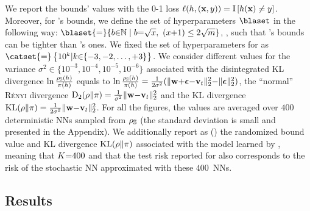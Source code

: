 We report the bounds' values with the 0-1 loss $\ell(h, (\mathbf{x},y))=\operatorname{I}\left[ h(\mathbf{x})\ne y\right]$.
Moreover, for \algoblanchard's bounds, we define the set of hyperparameters $\blaset$ in the following way: \mbox{$\blaset{=}\{ b{\in}\Nbb \;\vert\;  b{=}\sqrt{x},\ (x{+}1) \le 2\sqrt{\m} \}$}, \ie, such that \algoblanchard's bounds can be tighter than \algorivasplata's ones.
We fixed the set of hyperparameters for \algocatoni as $\catset{=}\left\{10^{k} \vert k{\in}\{-3, -2, \dots, +3\}\right\}$.
We consider different values for the variance $\sigma^2 {\in} \{10^{-3}, 10^{-4}, 10^{-5}, 10^{-6}\}$ associated with the disintegrated KL divergence $\ln\frac{\rho_{\mathbb{S}}(h)}{\pi(h)}$ equals to $\ln\frac{\rho_{\mathbb{S}}(h)}{\pi(h)}= \frac{1}{2\sigma^2}(\| \mathbf{w}{+}\boldsymbol{\epsilon}{-}\mathbf{v}_t\|^2_{2} {-}\|\boldsymbol{\epsilon}\|^2_{2})$, the ``normal'' \textsc{Rényi} divergence $\operatorname{D}_2(\rho\|\pi)=\tfrac{1}{\sigma^2}\|\mathbf{w}{-}\mathbf{v}_t\|_{2}^{2}$ and the KL divergence $\operatorname{KL}(\rho\|\pi)=\tfrac{1}{2\sigma^2}\|\mathbf{w}{-}\mathbf{v}_t\|_{2}^{2}$.
For all the figures, the values are averaged over $400$ deterministic NNs sampled from $\rho_{\mathbb{S}}$ (the standard deviation is small and presented in the Appendix).
We additionally report as \algostoNN () the randomized bound value and KL divergence $\operatorname{KL}(\rho\|\pi)$ associated with the model learned by \algoours, meaning that $K{=}400$ and that the test risk reported for \algoours also corresponds to the risk of the stochastic NN approximated with these \mbox{$400$ NNs}.

\subsection{Results}

